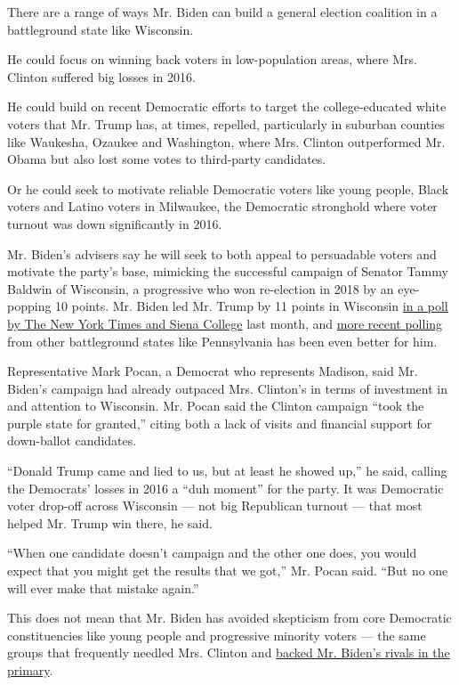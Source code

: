 There are a range of ways Mr. Biden can build a general election
coalition in a battleground state like Wisconsin.

He could focus on winning back voters in low-population areas, where
Mrs. Clinton suffered big losses in 2016.

He could build on recent Democratic efforts to target the
college-educated white voters that Mr. Trump has, at times, repelled,
particularly in suburban counties like Waukesha, Ozaukee and Washington,
where Mrs. Clinton outperformed Mr. Obama but also lost some votes to
third-party candidates.

Or he could seek to motivate reliable Democratic voters like young
people, Black voters and Latino voters in Milwaukee, the Democratic
stronghold where voter turnout was down significantly in 2016.

Mr. Biden's advisers say he will seek to both appeal to persuadable
voters and motivate the party's base, mimicking the successful campaign
of Senator Tammy Baldwin of Wisconsin, a progressive who won re-election
in 2018 by an eye-popping 10 points. Mr. Biden led Mr. Trump by 11
points in Wisconsin
\href{https://www.nytimes.com/2020/06/25/upshot/poll-2020-biden-battlegrounds.html}{in
a poll by The New York Times and Siena College} last month, and
\href{https://www.monmouth.edu/polling-institute/reports/monmouthpoll_pa_071520/}{more
recent polling} from other battleground states like Pennsylvania has
been even better for him.

Representative Mark Pocan, a Democrat who represents Madison, said Mr.
Biden's campaign had already outpaced Mrs. Clinton's in terms of
investment in and attention to Wisconsin. Mr. Pocan said the Clinton
campaign ``took the purple state for granted,'' citing both a lack of
visits and financial support for down-ballot candidates.

``Donald Trump came and lied to us, but at least he showed up,'' he
said, calling the Democrats' losses in 2016 a ``duh moment'' for the
party. It was Democratic voter drop-off across Wisconsin --- not big
Republican turnout --- that most helped Mr. Trump win there, he said.

``When one candidate doesn't campaign and the other one does, you would
expect that you might get the results that we got,'' Mr. Pocan said.
``But no one will ever make that mistake again.''

This does not mean that Mr. Biden has avoided skepticism from core
Democratic constituencies like young people and progressive minority
voters --- the same groups that frequently needled Mrs. Clinton and
\href{https://www.nytimes.com/2019/09/20/us/politics/joe-biden-black-voters.html}{backed
Mr. Biden's rivals in the primary}.

